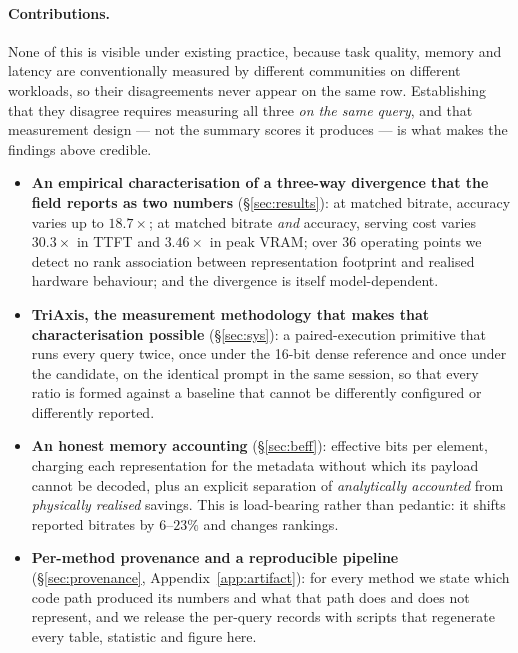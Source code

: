 \documentclass[sigplan,10pt,anonymous,review,nonacm]{acmart}
\newcommand{\sys}{TriAxis}
\begin{document}
\paragraph{Contributions.}\label{M-contrib}
None of this is visible under existing practice, because task quality, memory
and latency are conventionally measured by different communities on different
workloads, so their disagreements never appear on the same row. Establishing
that they disagree requires measuring all three \emph{on the same query}, and
that measurement design --- not the summary scores it produces --- is what
makes the findings above credible.
\begin{itemize}[leftmargin=*,itemsep=2.0pt,topsep=3pt]
\item \textbf{An empirical characterisation of a three-way divergence that the
  field reports as two numbers} (\S\ref{sec:results}): at matched bitrate,
  accuracy varies up to $18.7\times$; at matched bitrate \emph{and} accuracy,
  serving cost varies $30.3\times$ in TTFT and $3.46\times$ in peak VRAM; over
  36 operating points we detect no rank association between representation
  footprint and realised hardware behaviour; and the divergence is itself
  model-dependent.
\item \textbf{\sys{}, the measurement methodology that makes that
  characterisation possible} (\S\ref{sec:sys}): a paired-execution primitive
  that runs every query twice, once under the 16-bit dense reference and once
  under the candidate, on the identical prompt in the same session, so that
  every ratio is formed against a baseline that cannot be differently
  configured or differently reported.
\item \textbf{An honest memory accounting} (\S\ref{sec:beff}): effective bits
  per element, charging each representation for the metadata without which its
  payload cannot be decoded, plus an explicit separation of
  \emph{analytically accounted} from \emph{physically realised} savings. This
  is load-bearing rather than pedantic: it shifts reported bitrates by
  $6$--$23\%$ and changes rankings.
\item \textbf{Per-method provenance and a reproducible pipeline}
  (\S\ref{sec:provenance}, Appendix~\ref{app:artifact}): for every method we
  state which code path produced its numbers and what that path does and does
  not represent, and we release the per-query records with scripts that
  regenerate every table, statistic and figure here.
\end{itemize}
\end{document}
